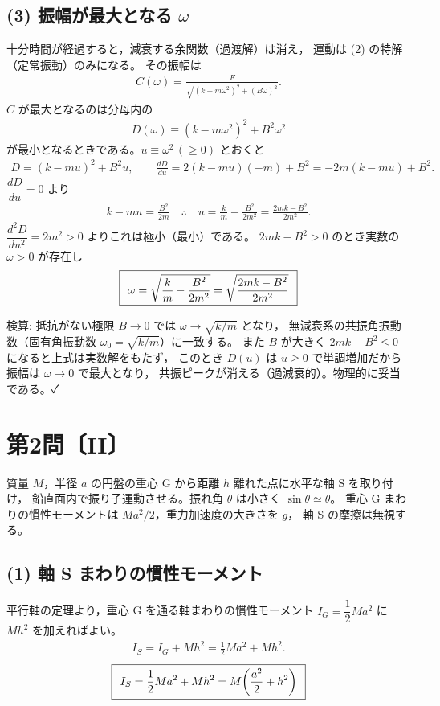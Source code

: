 \documentclass[11pt,a4paper]{article}
\begin{document}
\subsection*{(3) 振幅が最大となる $\omega$}
十分時間が経過すると，減衰する余関数（過渡解）は消え，
運動は (2) の特解（定常振動）のみになる。
その振幅は
\begin{align*}
  C(\omega)=\frac{F}{\sqrt{(k-m\omega^2)^2+(B\omega)^2}}.
\end{align*}
$C$ が最大となるのは分母内の
\begin{align*}
  D(\omega)\equiv (k-m\omega^2)^2+B^2\omega^2
\end{align*}
が最小となるときである。$u\equiv\omega^2\,(\ge 0)$ とおくと
\begin{align*}
  D=(k-mu)^2+B^2u,\qquad
  \frac{dD}{du}=2(k-mu)(-m)+B^2=-2m(k-mu)+B^2.
\end{align*}
$\dfrac{dD}{du}=0$ より
\begin{align*}
  k-mu=\frac{B^2}{2m}
  \quad\therefore\quad u=\frac{k}{m}-\frac{B^2}{2m^2}=\frac{2mk-B^2}{2m^2}.
\end{align*}
$\dfrac{d^2D}{du^2}=2m^2>0$ よりこれは極小（最小）である。
$2mk-B^2>0$ のとき実数の $\omega>0$ が存在し
\[
  \boxed{\,\;\omega=\sqrt{\dfrac{k}{m}-\dfrac{B^2}{2m^2}}
  =\sqrt{\dfrac{2mk-B^2}{2m^2}}\;\,}
\]

\medskip
検算: 抵抗がない極限 $B\to0$ では $\omega\to\sqrt{k/m}$ となり，
無減衰系の共振角振動数（固有角振動数 $\omega_0=\sqrt{k/m}$）に一致する。
また $B$ が大きく $2mk-B^2\le0$ になると上式は実数解をもたず，
このとき $D(u)$ は $u\ge0$ で単調増加だから振幅は $\omega\to0$ で最大となり，
共振ピークが消える（過減衰的）。物理的に妥当である。✓

\clearpage
\section*{第2問〔II〕}

質量 $M$，半径 $a$ の円盤の重心 G から距離 $h$ 離れた点に水平な軸 S を取り付け，
鉛直面内で振り子運動させる。振れ角 $\theta$ は小さく $\sin\theta\simeq\theta$。
重心 G まわりの慣性モーメントは $Ma^2/2$，重力加速度の大きさを $g$，
軸 S の摩擦は無視する。

\subsection*{(1) 軸 S まわりの慣性モーメント}
平行軸の定理より，重心 G を通る軸まわりの慣性モーメント $I_G=\dfrac{1}{2}Ma^2$ に
$Mh^2$ を加えればよい。
\begin{align*}
  I_S=I_G+Mh^2=\frac{1}{2}Ma^2+Mh^2.
\end{align*}
\[
  \boxed{\,\;I_S=\dfrac{1}{2}Ma^2+Mh^2=M\!\left(\dfrac{a^2}{2}+h^2\right)\;\,}
\]
\end{document}
